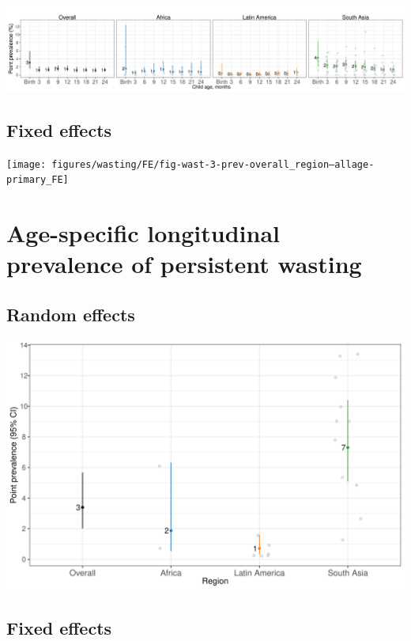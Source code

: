 \documentclass[
  9pt,
]{book}
\begin{document}
\includegraphics[width=58.33in]{figures/wasting/fig-wast-3-prev-overall_region--allage-primary}

\hypertarget{fixed-effects-5}{%
\subsection{Fixed effects}\label{fixed-effects-5}}

\texttt{[image: figures/wasting/FE/fig-wast-3-prev-overall\_region--allage-primary\_FE]}

\hypertarget{age-specific-longitudinal-prevalence-of-persistent-wasting}{%
\section{Age-specific longitudinal prevalence of persistent wasting}\label{age-specific-longitudinal-prevalence-of-persistent-wasting}}

\hypertarget{random-effects-5}{%
\subsection{Random effects}\label{random-effects-5}}

\includegraphics[width=33.33in]{figures/wasting/pooled_pers024}

\hypertarget{fixed-effects-6}{%
\subsection{Fixed effects}\label{fixed-effects-6}}
\end{document}
